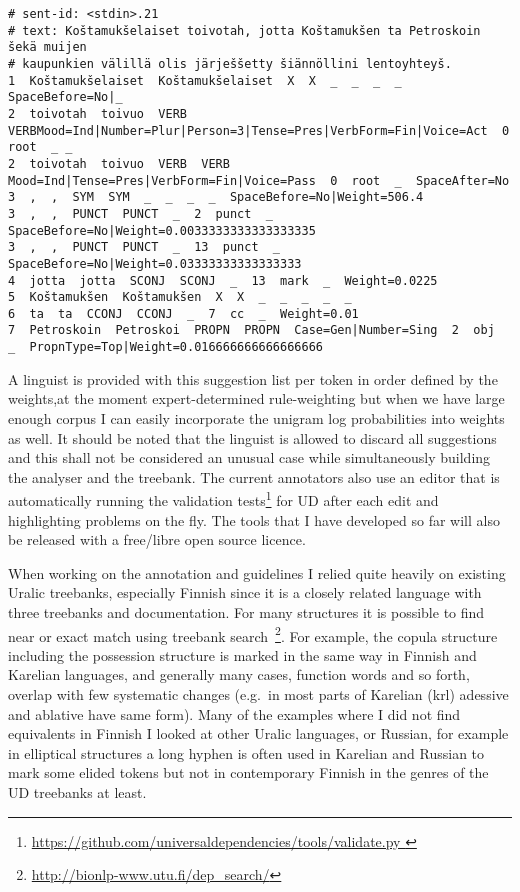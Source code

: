 \documentclass{flammie}
\begin{document}
\begin{scriptsize}
\begin{verbatim}
# sent-id: <stdin>.21
# text: Koštamukšelaiset toivotah, jotta Koštamukšen ta Petroskoin šekä muijen
# kaupunkien välillä olis järješšetty šiännöllini lentoyhteyš.
1  Koštamukšelaiset  Koštamukšelaiset  X  X  _  _  _  _  SpaceBefore=No|_
2  toivotah  toivuo  VERB  VERBMood=Ind|Number=Plur|Person=3|Tense=Pres|VerbForm=Fin|Voice=Act  0  root  _ _
2  toivotah  toivuo  VERB  VERB  Mood=Ind|Tense=Pres|VerbForm=Fin|Voice=Pass  0  root  _  SpaceAfter=No
3  ,  ,  SYM  SYM  _  _  _  _  SpaceBefore=No|Weight=506.4
3  ,  ,  PUNCT  PUNCT  _  2  punct  _  SpaceBefore=No|Weight=0.0033333333333333335
3  ,  ,  PUNCT  PUNCT  _  13  punct  _  SpaceBefore=No|Weight=0.03333333333333333
4  jotta  jotta  SCONJ  SCONJ  _  13  mark  _  Weight=0.0225
5  Koštamukšen  Koštamukšen  X  X  _  _  _  _  _
6  ta  ta  CCONJ  CCONJ  _  7  cc  _  Weight=0.01
7  Petroskoin  Petroskoi  PROPN  PROPN  Case=Gen|Number=Sing  2  obj  _  PropnType=Top|Weight=0.016666666666666666
\end{verbatim}
\end{scriptsize}

A linguist is provided with this suggestion list per token in order defined by
the weights,at the moment expert-determined rule-weighting but when we have
large enough corpus I can easily incorporate the unigram log probabilities into
weights as well. It should be noted that the linguist is allowed to discard all
suggestions and this shall not be considered an unusual case while
simultaneously building the analyser and the treebank. The current annotators
also use an editor that is automatically running the validation
tests\footnote{\url{https://github.com/universaldependencies/tools/validate.py
}} for UD after each edit and highlighting problems on the fly. The tools that
I have developed so far will also be released with a free/libre open source
licence.

When working on the annotation and guidelines I relied quite heavily on
existing Uralic treebanks, especially Finnish since it is a closely related
language with three treebanks and documentation. For many structures it is
possible to find near or exact match using treebank
search~\footnote{\url{http://bionlp-www.utu.fi/dep_search/}}. For example, the
copula structure including the possession structure is marked in the same way in
Finnish and Karelian languages, and generally many cases, function words and so
forth, overlap with few systematic changes (e.g.\ in most parts of Karelian
(krl) adessive and ablative have same form). Many of the examples where I did
not find equivalents in Finnish I looked at other Uralic languages, or Russian,
for example in elliptical structures a long hyphen is often used in Karelian and
Russian to mark some elided tokens but not in contemporary Finnish in the genres
of the UD treebanks at least.
\end{document}
